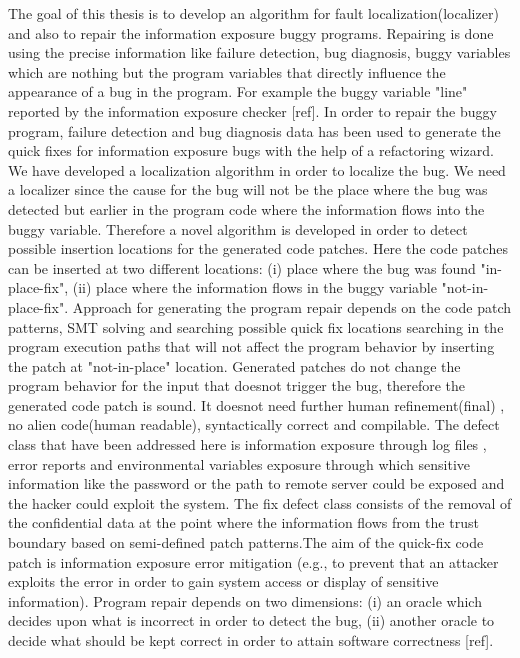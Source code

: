 The goal of this thesis is to develop an algorithm for fault localization(localizer) and also to repair the 
information exposure buggy programs. Repairing is done using the precise information like failure detection,
bug diagnosis, buggy variables which are nothing but the program variables that directly influence
the appearance of a bug in the program.
For example the buggy variable "line" reported by the information exposure checker [ref]. In order to 
repair the buggy program, failure detection and bug diagnosis data has been used to generate the quick fixes
for information exposure bugs with the help of a refactoring wizard. We have developed a localization algorithm 
in order to localize the bug. We need a localizer since the cause for the bug will not be the place where
the bug was detected but earlier in the program code where the information flows into the buggy variable.
Therefore a novel algorithm is developed in order to detect possible insertion locations for the generated code patches.
Here the code patches can be inserted at two different locations: (i) place where the bug was found \textthreequartersemdash "in-place-fix", (ii) place where the
information flows in the buggy variable \textthreequartersemdash  "not-in-place-fix". Approach for generating
the program repair depends on the code patch patterns, SMT solving and searching possible quick fix locations searching in the 
program execution paths that will not affect the program behavior by inserting the patch at "not-in-place" location.
Generated patches do not change the program behavior for the input that doesnot trigger the bug, therefore the generated code patch
is sound. It doesnot need further human refinement(final) , no alien code(human readable), syntactically correct and compilable.
The defect class that have been addressed here is information exposure through log files , error reports and environmental variables exposure through
which sensitive information like the password or the path to remote server could be exposed and the hacker could exploit the system.
The fix defect class consists of the removal of the confidential data at the point where the information flows from the
trust boundary based on semi-defined patch patterns.The aim of the quick-fix code patch is 
information exposure error mitigation (e.g., to prevent
that an attacker exploits the error in order to gain system access or display of sensitive information).
Program repair depends on two dimensions: (i) an oracle which decides upon what is incorrect in order to detect the bug, (ii)
another oracle to decide what should be kept correct in order to attain software correctness [ref]. 

